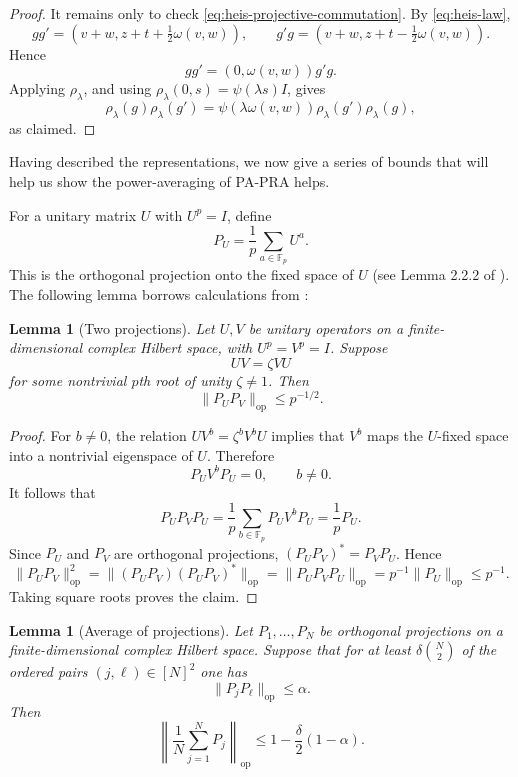 \documentclass[11pt, reqno]{amsart}
\numberwithin{equation}{section}
\newtheorem{lemma}[theorem]{Lemma}
\newcommand{\Fp}{\mathbb F_p}
\begin{document}
\begin{proof}
It remains only to check \eqref{eq:heis-projective-commutation}.  By
\eqref{eq:heis-law},
\[
    gg'=(v+w,z+t+\tfrac12\omega(v,w)),
    \qquad
    g'g=(v+w,z+t-\tfrac12\omega(v,w)).
\]
Hence
\[
    gg'=(0,\omega(v,w))g'g.
\]
Applying $\rho_\lambda$, and using
$\rho_\lambda(0,s)=\psi(\lambda s)I$, gives
\[
    \rho_\lambda(g)\rho_\lambda(g')
    =
    \psi(\lambda\omega(v,w))\rho_\lambda(g')\rho_\lambda(g),
\]
as claimed.
\end{proof}


Having described the representations, we now give a series of bounds that will help us show the power-averaging of PA-PRA helps. 

For a unitary matrix \(U\) with \(U^p=I\), define
\[
    P_U=\frac1p\sum_{a\in\Fp}U^a.
\]
This is the orthogonal projection onto the fixed space of \(U\) (see Lemma 2.2.2 of \cite{Sturmfels2008Algorithms}). The following lemma borrows calculations from \cite{Halmos1969TwoSubspaces}:

\begin{lemma}[Two projections]\label{lem:heis-two-projections}
Let \(U,V\) be unitary operators on a finite-dimensional complex Hilbert space,
with \(U^p=V^p=I\).  Suppose
\[
    UV=\zeta VU
\]
for some nontrivial \(p\)th root of unity \(\zeta\ne1\).  Then
\[
    \|P_UP_V\|_{\mathrm{op}}\le p^{-1/2}.
\]
\end{lemma}

\begin{proof}
For \(b\ne0\), the relation \(UV^b=\zeta^bV^bU\) implies that \(V^b\) maps the
\(U\)-fixed space into a nontrivial eigenspace of \(U\).  Therefore
\[
    P_UV^bP_U=0,\qquad b\ne0.
\]
It follows that
\[
    P_UP_VP_U=\frac1p\sum_{b\in\Fp}P_UV^bP_U=\frac1pP_U.
\]
Since \(P_U\) and \(P_V\) are orthogonal projections,
\((P_UP_V)^*=P_VP_U\).  Hence
\[
    \|P_UP_V\|_{\mathrm{op}}^2
    =\|(P_UP_V)(P_UP_V)^*\|_{\mathrm{op}}
    =\|P_UP_VP_U\|_{\mathrm{op}}
    =p^{-1}\|P_U\|_{\mathrm{op}}
    \le p^{-1}.
\]
Taking square roots proves the claim.
\end{proof}

\begin{lemma}[Average of projections]\label{lem:heis-average-projections}
Let \(P_1,\ldots,P_N\) be orthogonal projections on a finite-dimensional
complex Hilbert space.  Suppose that for at least 
 \(\delta {N \choose 2}\) of the ordered pairs \((j,\ell)\in[N]^2\) one has
\[
    \|P_jP_\ell\|_{\mathrm{op}}\le\alpha.
\]
Then
\[
    \left\|\frac1N\sum_{j=1}^NP_j\right\|_{\mathrm{op}}
    \le 1-\frac\delta2(1-\alpha).
\]
\end{lemma}
\end{document}
